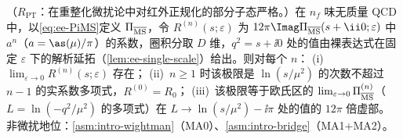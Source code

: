 \begin{theorem}\label{thm:ee-R-finite}
（$R_{\mathrm{PT}}$：在重整化微扰论中对红外正规化的部分子态严格。）在 $n_f$ 味无质量 QCD 中，以\cref{eq:ee-PiMS}定义 $\Pi_{\overline{\rm MS}}$，令 $R^{(n)}(s;\varepsilon)$ 为 $12\pi\Imag\Pi_{\overline{\rm MS}}(s+\ii0;\varepsilon)$ 中 $a^n$（$a=\as(\mu)/\pi$）的系数，圈积分取 $D$ 维，$q^2=s+\ii0$ 处的值由裸表达式在固定 $\varepsilon$ 下的解析延拓（\cref{lem:ee-single-scale}）给出。则对每个 $n$：
(i)~$\lim_{\varepsilon\to0}R^{(n)}(s;\varepsilon)$ 存在；
(ii)~$n\ge1$ 时该极限是 $\ln(s/\mu^2)$ 的次数不超过 $n-1$ 的实系数多项式，$R^{(0)}=R_0$；
(iii)~该极限等于欧氏区的 $\lim_{\varepsilon\to0}\Pi^{(n)}_{\overline{\rm MS}}$（$L=\ln(-q^2/\mu^2)$ 的多项式）在 $L\to\ln(s/\mu^2)-\ii\pi$ 处的值的 $12\pi$ 倍虚部。
非微扰地位：\cref{asm:intro-wightman}（MA0）、\cref{asm:intro-bridge}（MA1+MA2）。
\end{theorem}
